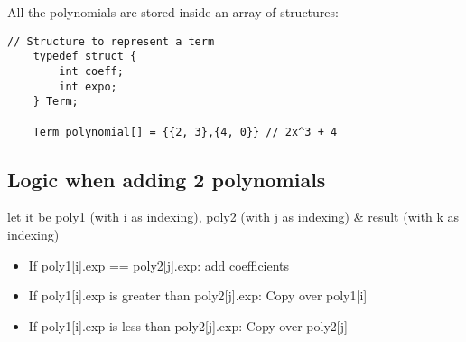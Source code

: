 \documentclass{article}
\begin{document}
All the polynomials are stored inside an array of structures:
\begin{lstlisting}[caption={Sparse Polynomial Addition Outline}]
    // Structure to represent a term
    typedef struct {
        int coeff;
        int expo;
    } Term;

    Term polynomial[] = {{2, 3},{4, 0}} // 2x^3 + 4
\end{lstlisting}

\subsection{Logic when adding 2 polynomials}
let it be poly1 (with i as indexing),  poly2 (with j as indexing) \&  result (with k as indexing)

\begin{itemize}
    \item If poly1[i].exp ==  poly2[j].exp: add coefficients
    \item If poly1[i].exp is greater than poly2[j].exp: Copy over poly1[i]
    \item If poly1[i].exp is less than poly2[j].exp: Copy over poly2[j]
\end{itemize}
\end{document}
